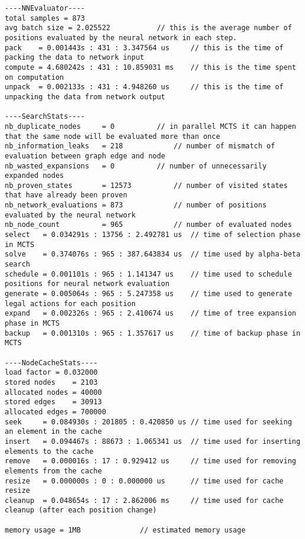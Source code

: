 \documentclass[12pt,a4paper]{article}
\begin{document}
\begin{scriptsize}
\begin{verbatim}
----NNEvaluator----
total samples = 873
avg batch size = 2.025522			// this is the average number of positions evaluated by the neural network in each step.
pack    = 0.001443s : 431 : 3.347564 us		// this is the time of packing the data to network input
compute = 4.680242s : 431 : 10.859031 ms	// this is the time spent on computation
unpack  = 0.002133s : 431 : 4.948260 us		// this is the time of unpacking the data from network output

----SearchStats----
nb_duplicate_nodes     = 0			// in parallel MCTS it can happen that the same node will be evaluated more than once
nb_information_leaks   = 218			// number of mismatch of evaluation between graph edge and node
nb_wasted_expansions   = 0			// number of unnecessarily expanded nodes
nb_proven_states       = 12573			// number of visited states that have already been proven
nb_network_evaluations = 873			// number of positions evaluated by the neural network
nb_node_count          = 965			// number of evaluated nodes
select   = 0.034291s : 13756 : 2.492781 us	// time of selection phase in MCTS
solve    = 0.374076s : 965 : 387.643834 us	// time used by alpha-beta search
schedule = 0.001101s : 965 : 1.141347 us	// time used to schedule positions for neural network evaluation
generate = 0.005064s : 965 : 5.247358 us	// time used to generate legal actions for each position
expand   = 0.002326s : 965 : 2.410674 us	// time of tree expansion phase in MCTS
backup   = 0.001310s : 965 : 1.357617 us	// time of backup phase in MCTS

----NodeCacheStats----
load factor = 0.032000
stored nodes    = 2103
allocated nodes = 40000
stored edges    = 30913
allocated edges = 700000
seek     = 0.084930s : 201805 : 0.420850 us	// time used for seeking an element in the cache
insert   = 0.094467s : 88673 : 1.065341 us	// time used for inserting elements to the cache
remove   = 0.000016s : 17 : 0.929412 us		// time used for removing elements from the cache
resize   = 0.000000s : 0 : 0.000000 us		// time used for cache resize
cleanup  = 0.048654s : 17 : 2.862006 ms		// time used for cache cleanup (after each position change)

memory usage = 1MB				// estimated memory usage	
\end{verbatim}
\end{scriptsize}				


\newpage
\end{document}
